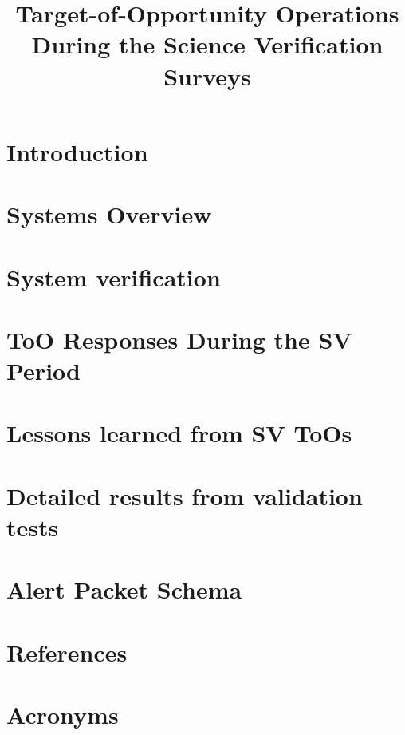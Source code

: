 \documentclass[OPS,lsstdraft,authoryear,toc]{lsstdoc}
\title{Target-of-Opportunity Operations During the Science Verification Surveys}
\date{\vcsDate}
\begin{document}
\maketitle
\section{Introduction}\label{sec:introduction}

\newpage
\section{Systems Overview}\label{sec:sysOverview}

\newpage
\section{System verification}\label{sec:verification}

\newpage
% 
\newpage
\section{ToO Responses During the SV Period}\label{sec:ToOEvents}

\newpage
\section{Lessons learned from SV ToOs}\label{sec:LessonsLearned}


\appendix
\newpage
\section{Detailed results from validation tests} \label{sec:validationResults}

\newpage
\section{Alert Packet Schema} \label{appendix:SCiMMASchema}

\newpage
\section{References} \label{sec:bib}
\renewcommand{\refname}{} %


\newpage
\section{Acronyms} \label{sec:acronyms}

\end{document}
